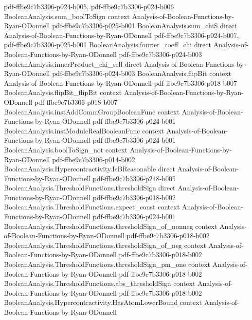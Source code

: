 \begin{lemma}
  {pdf-ffbe9c7b3306-p024-b005,
    pdf-ffbe9c7b3306-p024-b006}
\proofstep
  {BooleanAnalysis.sum_boolToSign}
  {context}
  {Analysis-of-Boolean-Functions-by-Ryan-ODonnell}
  {pdf-ffbe9c7b3306-p025-b001}
\proofstep
  {BooleanAnalysis.sum_chiS}
  {direct}
  {Analysis-of-Boolean-Functions-by-Ryan-ODonnell}
  {pdf-ffbe9c7b3306-p024-b007,
    pdf-ffbe9c7b3306-p025-b001}
\proofstep
  {BooleanAnalysis.fourier_coeff_chi}
  {direct}
  {Analysis-of-Boolean-Functions-by-Ryan-ODonnell}
  {pdf-ffbe9c7b3306-p024-b003}
\proofstep
  {BooleanAnalysis.innerProduct_chi_self}
  {direct}
  {Analysis-of-Boolean-Functions-by-Ryan-ODonnell}
  {pdf-ffbe9c7b3306-p024-b003}
\proofstep
  {BooleanAnalysis.flipBit}
  {context}
  {Analysis-of-Boolean-Functions-by-Ryan-ODonnell}
  {pdf-ffbe9c7b3306-p018-b007}
\proofstep
  {BooleanAnalysis.flipBit_flipBit}
  {context}
  {Analysis-of-Boolean-Functions-by-Ryan-ODonnell}
  {pdf-ffbe9c7b3306-p018-b007}
\proofstep
  {BooleanAnalysis.instAddCommGroupBooleanFunc}
  {context}
  {Analysis-of-Boolean-Functions-by-Ryan-ODonnell}
  {pdf-ffbe9c7b3306-p024-b001}
\proofstep
  {BooleanAnalysis.instModuleRealBooleanFunc}
  {context}
  {Analysis-of-Boolean-Functions-by-Ryan-ODonnell}
  {pdf-ffbe9c7b3306-p024-b001}
\proofstep
  {BooleanAnalysis.boolToSign_not}
  {context}
  {Analysis-of-Boolean-Functions-by-Ryan-ODonnell}
  {pdf-ffbe9c7b3306-p014-b002}
\proofstep
  {BooleanAnalysis.Hypercontractivity.IsBReasonable}
  {direct}
  {Analysis-of-Boolean-Functions-by-Ryan-ODonnell}
  {pdf-ffbe9c7b3306-p248-b005}
\proofstep
  {BooleanAnalysis.ThresholdFunctions.thresholdSign}
  {direct}
  {Analysis-of-Boolean-Functions-by-Ryan-ODonnell}
  {pdf-ffbe9c7b3306-p018-b002}
\proofstep
  {BooleanAnalysis.ThresholdFunctions.expect_const}
  {context}
  {Analysis-of-Boolean-Functions-by-Ryan-ODonnell}
  {pdf-ffbe9c7b3306-p024-b001}
\proofstep
  {BooleanAnalysis.ThresholdFunctions.thresholdSign_of_nonneg}
  {context}
  {Analysis-of-Boolean-Functions-by-Ryan-ODonnell}
  {pdf-ffbe9c7b3306-p018-b002}
\proofstep
  {BooleanAnalysis.ThresholdFunctions.thresholdSign_of_neg}
  {context}
  {Analysis-of-Boolean-Functions-by-Ryan-ODonnell}
  {pdf-ffbe9c7b3306-p018-b002}
\proofstep
  {BooleanAnalysis.ThresholdFunctions.thresholdSign_pm_one}
  {context}
  {Analysis-of-Boolean-Functions-by-Ryan-ODonnell}
  {pdf-ffbe9c7b3306-p018-b002}
\proofstep
  {BooleanAnalysis.ThresholdFunctions.abs_thresholdSign}
  {context}
  {Analysis-of-Boolean-Functions-by-Ryan-ODonnell}
  {pdf-ffbe9c7b3306-p018-b002}
\proofstep
  {BooleanAnalysis.Hypercontractivity.HasAtomLowerBound}
  {context}
  {Analysis-of-Boolean-Functions-by-Ryan-ODonnell}

\end{lemma}
